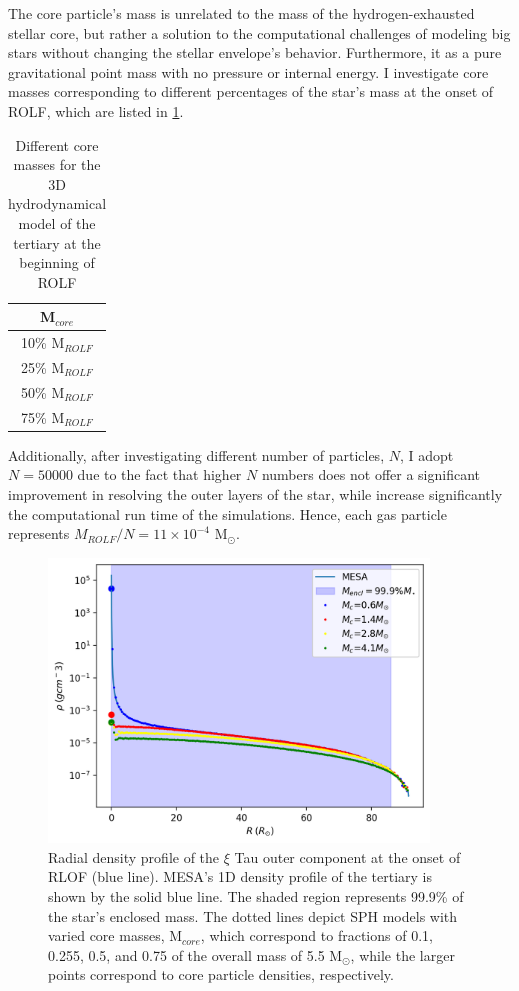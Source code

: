 The core particle's mass is unrelated to the mass of the hydrogen-exhausted stellar core, but rather a solution to the computational challenges of modeling big stars without changing the stellar envelope's behavior. Furthermore, it as a pure gravitational point mass with no pressure or internal energy. I investigate core masses corresponding to different percentages of the star's mass at the onset of ROLF, which are listed in \cref{tab:core_masses_ROLF}. 
\begin{table}[H]
    \centering
    \begin{tabular}{| c |}
       M$_{core}$  \\
       \hline
       10\% M$_{ROLF}$\\
       25\% M$_{ROLF}$\\
       50\% M$_{ROLF}$\\
       75\% M$_{ROLF}$
    \end{tabular}
    \caption{ Different core masses for the 3D hydrodynamical model of the tertiary at the beginning of ROLF}
    \label{tab:core_masses_ROLF}
\end{table}
Additionally, after investigating different number of particles, $N$, I adopt $N=50000$  due to the fact that higher $N$ numbers does not offer a significant improvement in resolving the outer layers of the star, while increase significantly the computational run time of the simulations.  Hence, each gas particle represents $M_{ROLF}/N = 11 \times 10^{-4}$ M$_{\odot}$.
\begin{figure}[H]
    \centering
    \includegraphics[width=0.9\textwidth]{Thesis/graphs/ROLF_density_profile.pdf}
    \caption{Radial density profile of the  $\xi$ Tau outer component at the onset of RLOF (blue line). MESA's 1D density profile of the tertiary is shown by the solid blue line. The shaded region represents 99.9\% of the star's enclosed mass. The dotted lines depict SPH models with varied core masses, M$_{core}$, which correspond to fractions of 0.1, 0.255, 0.5, and 0.75 of the overall mass of 5.5 M$_{\odot}$, while the larger points correspond to core particle densities, respectively.}
    \label{fig:stellar_density_ROLF}
\end{figure}
